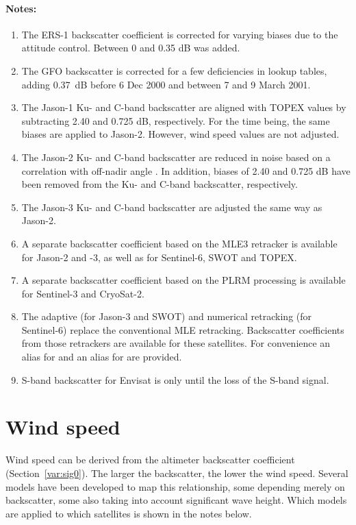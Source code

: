\documentclass[a4paper,11pt,openany,natbib,nomargin]{thesis}
\newenvironment{notes}[1][Notes:]{\FloatBarrier\paragraph{#1}\begin{enumerate}}{\end{enumerate}}
\begin{document}
\begin{notes}
\item The ERS-1 backscatter coefficient is corrected for varying biases due to the attitude control. Between 0 and 0.35 dB was added.\label{item:sig0_e1}
\item The GFO backscatter is corrected for a few deficiencies in lookup tables, adding 0.37~dB before 6 Dec 2000 and between 7 and 9 March 2001.\label{item:sig0_g1}
\item The Jason-1 Ku- and C-band backscatter are aligned with TOPEX values by subtracting 2.40 and 0.725 dB, respectively. For the time being, the same biases are applied to Jason-2. However, wind speed values are not adjusted.\label{item:sig0_j1}
\item The Jason-2 Ku- and C-band backscatter are reduced in noise based on a correlation with off-nadir angle \citep{quartly2009a}. In addition, biases of 2.40 and 0.725 dB have been removed from the Ku- and C-band backscatter, respectively.\label{item:sig0_j2}
\item The Jason-3 Ku- and C-band backscatter are adjusted the same way as Jason-2.\label{item:sig0_j3}
\item A separate backscatter coefficient based on the MLE3 retracker is available for Jason-2 and -3, as well as for Sentinel-6, SWOT and TOPEX.\label{item:sig0_ku_mle3}\label{item:sig0_rms_ku_mle3}
\item A separate backscatter coefficient based on the PLRM processing is available for Sentinel-3 and CryoSat-2.\label{item:sig0_ku_plrm}\label{item:sig0_rms_ku_plrm}
\item The adaptive (for Jason-3 and SWOT) and numerical retracking (for Sentinel-6) replace the conventional MLE retracking. Backscatter coefficients from those retrackers are available for these satellites. For convenience an alias  for  and an alias  for  are provided.\label{item:sig0_ku_adaptive}\label{item:sig0_ku_nr}\label{item:sig0_rms_ku_adaptive}\label{item:sig0_rms_ku_nr}
\item S-band backscatter for Envisat is only until the loss of the S-band signal.\label{item:sig0_n1}
\end{notes}

\section{Wind speed}
\label{var:wind}
Wind speed can be derived from the altimeter backscatter coefficient (Section~\ref{var:sig0}). The larger the backscatter, the lower the wind speed. Several models have been developed to map this relationship, some depending merely on backscatter, some also taking into account significant wave height. Which models are applied to which satellites is shown in the notes below.
\end{document}
